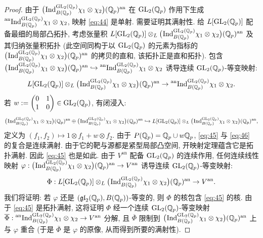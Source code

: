 \begin{proof}
由于 $\bigl(\prescript{}{}{\mathrm{Ind}}_{B(\mathbb{Q}_p)}^{\mathrm{GL}_2(\mathbb{Q}_p)} \chi_1 \otimes \chi_2\bigr)(\mathbb{Q}_p)^{\mathrm{an}}$ 在 $\mathrm{GL}_2(\mathbb{Q}_p)$ 作用下生成 $\prescript{\mathrm{an}}{}{\mathrm{Ind}}_{B(\mathbb{Q}_p)}^{\mathrm{GL}_2(\mathbb{Q}_p)} \chi_1 \otimes \chi_2$, 映射 \eqref{eq:44} 是单射.
需要证明其满射性.
给 $L[\mathrm{GL}_2(\mathbb{Q}_p)]$ 配备最细的局部凸拓扑, 考虑张量积 $L[\mathrm{GL}_2(\mathbb{Q}_p)] \otimes_L \bigl(\prescript{}{}{\mathrm{Ind}}_{B(\mathbb{Q}_p)}^{\mathrm{GL}_2(\mathbb{Q}_p)} \chi_1 \otimes \chi_2\bigr)(\mathbb{Q}_p)^{\mathrm{an}}$ 及其归纳张量积拓扑 (此空间同构于以 $\mathrm{GL}_2(\mathbb{Q}_p)$ 的元素为指标的 $\bigl(\prescript{}{}{\mathrm{Ind}}_{B(\mathbb{Q}_p)}^{\mathrm{GL}_2(\mathbb{Q}_p)} \chi_1 \otimes \chi_2\bigr)(\mathbb{Q}_p)^{\mathrm{an}}$ 的拷贝的直和, 该拓扑正是直和拓扑).
包含 $\bigl(\prescript{}{}{\mathrm{Ind}}_{B(\mathbb{Q}_p)}^{\mathrm{GL}_2(\mathbb{Q}_p)} \chi_1 \otimes \chi_2\bigr)(\mathbb{Q}_p)^{\mathrm{an}} \hookrightarrow \prescript{\mathrm{an}}{}{\mathrm{Ind}}_{B(\mathbb{Q}_p)}^{\mathrm{GL}_2(\mathbb{Q}_p)} \chi_1 \otimes \chi_2$ 诱导连续 $\mathrm{GL}_2(\mathbb{Q}_p)$-等变映射:
\begin{equation}
\label{eq:45}
L[\mathrm{GL}_2(\mathbb{Q}_p)] \otimes_L \bigl(\prescript{}{}{\mathrm{Ind}}_{B(\mathbb{Q}_p)}^{\mathrm{GL}_2(\mathbb{Q}_p)} \chi_1 \otimes \chi_2\bigr)(\mathbb{Q}_p)^{\mathrm{an}}
\to \prescript{\mathrm{an}}{}{\mathrm{Ind}}_{B(\mathbb{Q}_p)}^{\mathrm{GL}_2(\mathbb{Q}_p)} \chi_1 \otimes \chi_2.
\end{equation}
若 $w := \begin{pmatrix} 0 & 1 \\ 1 & 0 \end{pmatrix} \in \mathrm{GL}_2(\mathbb{Q}_p)$, 有闭浸入:
\begin{equation}
\label{eq:46}
\bigl(\prescript{}{}{\mathrm{Ind}}_{B(\mathbb{Q}_p)}^{\mathrm{GL}_2(\mathbb{Q}_p)} \chi_1 \otimes \chi_2\bigr)(\mathbb{Q}_p)^{\mathrm{an}}
\oplus \bigl(\prescript{}{}{\mathrm{Ind}}_{B(\mathbb{Q}_p)}^{\mathrm{GL}_2(\mathbb{Q}_p)} \chi_1 \otimes \chi_2\bigr)(\mathbb{Q}_p)^{\mathrm{an}}
\hookrightarrow L[\mathrm{GL}_2(\mathbb{Q}_p)] \otimes_L \bigl(\prescript{}{}{\mathrm{Ind}}_{B(\mathbb{Q}_p)}^{\mathrm{GL}_2(\mathbb{Q}_p)} \chi_1 \otimes \chi_2\bigr)(\mathbb{Q}_p)^{\mathrm{an}},
\end{equation}
定义为 $(f_1,f_2) \mapsto 1 \otimes f_1 + w \otimes f_2$.
由于 $P(\mathbb{Q}_p) = \mathbb{Q}_p \cup w\mathbb{Q}_p$, \eqref{eq:45} 与 \eqref{eq:46} 的复合是连续满射.
由于它的靶与源都是紧型局部凸空间, 开映射定理蕴含它是拓扑满射.
因此 \eqref{eq:45} 也是如此.
由于 $V^{\mathrm{an}}$ 配备 $\mathrm{GL}_2(\mathbb{Q}_p)$ 的连续作用, 任何连续线性映射 $\varphi : \bigl(\prescript{}{}{\mathrm{Ind}}_{B(\mathbb{Q}_p)}^{\mathrm{GL}_2(\mathbb{Q}_p)} \chi_1 \otimes \chi_2\bigr)(\mathbb{Q}_p)^{\mathrm{an}} \to V^{\mathrm{an}}$ 诱导连续 $\mathrm{GL}_2(\mathbb{Q}_p)$-等变映射:
\[
\Phi : L[\mathrm{GL}_2(\mathbb{Q}_p)] \otimes_L \bigl(\prescript{}{}{\mathrm{Ind}}_{B(\mathbb{Q}_p)}^{\mathrm{GL}_2(\mathbb{Q}_p)} \chi_1 \otimes \chi_2\bigr)(\mathbb{Q}_p)^{\mathrm{an}} \to V^{\mathrm{an}}.
\]
我们将证明: 若 $\varphi$ 还是 $(\mathfrak{gl}_2(\mathbb{Q}_p),B(\mathbb{Q}_p))$-等变的, 则 $\Phi$ 的核包含 \eqref{eq:45} 的核.
由于 \eqref{eq:45} 是拓扑满射, 这将证明 $\Phi$ 经一个连续 $\mathrm{GL}_2(\mathbb{Q}_p)$-等变映射 $\overline{\Phi} : \prescript{\mathrm{an}}{}{\mathrm{Ind}}_{B(\mathbb{Q}_p)}^{\mathrm{GL}_2(\mathbb{Q}_p)} \chi_1 \otimes \chi_2 \to V^{\mathrm{an}}$ 分解, 且 $\overline{\Phi}$ 限制到 $\bigl(\prescript{}{}{\mathrm{Ind}}_{B(\mathbb{Q}_p)}^{\mathrm{GL}_2(\mathbb{Q}_p)} \chi_1 \otimes \chi_2\bigr)(\mathbb{Q}_p)^{\mathrm{an}}$ 上与 $\varphi$ 重合 (于是 $\overline{\Phi}$ 是 $\varphi$ 的原像, 从而得到所要的满射性).

\end{proof}

